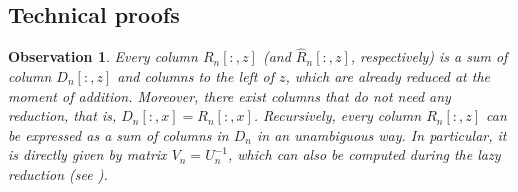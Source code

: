 \documentclass[a4paper,12pt, USenglish,cleveref,autoref,thm-restate]{article}
\newtheorem{observation}[theorem]{Observation}
\newcommand{\mU}{U}
\newcommand{\hmU}{\mU}
\newcommand{\hmB}{D}
\newcommand{\hmR}{R}
\begin{document}









    







\appendix


\begin{appendices}

\section{Technical proofs}\label{sec:technical}

\LefschetzIsSafe*

    \begin{observation}\label{obs:column-in-R-as-a-sum-of-columns-in-D}
    Every column $\hmR_n[:,z]$ (and $\hat{\hmR}_n[:,z]$, respectively) is a sum of column $\hmB_n[:,z]$ and columns to the left of $z$, 
        which are already reduced at the moment of addition. 
    Moreover, there exist columns that do not need any reduction, that is, $\hmB_n[:,x] = \hmR_n[:,x]$. 
    Recursively, every column $\hmR_n[:,z]$ can be expressed as a sum of columns in $\hmB_n$ in an unambiguous way.
    In particular, it is directly given by matrix $V_{n} =  \hmU_n^{-1}$, which can also be computed during the lazy reduction (see \cite{Vineyards,BigSteps}).
    \end{observation}


\end{appendices}
\end{document}
